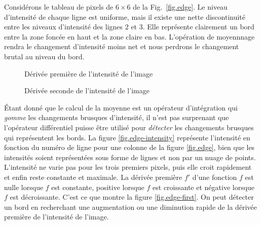 Considérons le tableau de pixels de $6 \times 6$ de la Fig.~\ref{fig.edge}. Le niveau d'intensité de chaque ligne est uniforme, mais il existe une nette discontinuité entre les niveaux d'intensité des lignes $2$ et $3$. Elle représente clairement un bord entre la zone foncée en haut et la zone claire en bas. L'opération de moyennnage rendra le changement d'intensité moins net et nous perdrons le changement brutal au niveau du bord.

\begin{figure}
\begin{minipage}{.5\textwidth}
\caption{Dérivée première de l'intensité de l'image}
\label{fig.edge-first}
\end{minipage}
\hspace{\fill}
\begin{minipage}{.5\textwidth}
\caption{Dérivée seconde de l'intensité de l'image}
\label{fig.edge-second}
\end{minipage}
\end{figure}

Étant donné que le calcul de la moyenne est un opérateur d'intégration qui \emph{gomme} les changements brusques d'intensité, il n'est pas surprenant que l'opérateur différentiel puisse être utilisé pour \emph{détecter} les changements brusques qui représentent les bords. La figure \ref{fig.edge-intensity} représente l'intensité en fonction du numéro de ligne pour une colonne de la figure \ref{fig.edge}, bien que les intensités soient représentées sous forme de lignes et non par un nuage de points. L'intensité ne varie pas pour les trois premiers pixels, puis elle croit rapidement et enfin reste constante et maximale. La dérivée première $f'$ d'une fonction $f$ est nulle lorsque $f$ est constante, positive lorsque $f$ est croissante et négative lorsque $f$ est décroissante. C'est ce que montre la figure \ref{fig.edge-first}. On peut détecter un bord en recherchant une augmentation ou une diminution rapide de la dérivée première de l'intensité de l'image.

